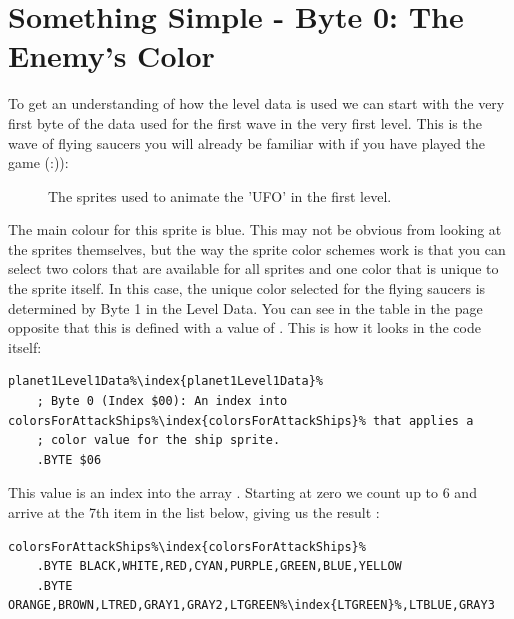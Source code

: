 \section{Something Simple - Byte 0: The Enemy's Color}
To get an understanding of how the level data is used we can start with the very first byte of the data
used for the first wave in the very first level. This is the wave of flying saucers you will already be
familiar with if you have played the game (:)):
\begin{figure}[H]
  {
    \setlength{\tabcolsep}{3.0pt}
    \setlength\cmidrulewidth{\heavyrulewidth} %
	\centering
	\def\MULTICOLORONE{white}
	\def\MULTICOLORTWO{red}
	\def\SPRITECOLOR{blue}
	\begin{subfigure}{0.3\textwidth}
		
	\end{subfigure}
	\begin{subfigure}{0.3\textwidth}
		
	\end{subfigure}
	\begin{subfigure}{0.3\textwidth}
		
	\end{subfigure}
  }\caption[position=top]{The sprites used to animate the 'UFO' in the first level.}
\end{figure}

The main colour for this sprite is blue. This may not be obvious from looking at the sprites themselves, but
the way the sprite color schemes work is that you can select two colors that are available for all sprites and
one color that is unique to the sprite itself. In this case, the unique color selected for the flying saucers is
determined by Byte 1 in the Level Data. You can see in the table in the page opposite
that this is defined with a value of . This is how it looks in the code itself:

\begin{lstlisting}[escapechar=\%]
planet1Level1Data%\index{planet1Level1Data}%
    ; Byte 0 (Index $00): An index into colorsForAttackShips%\index{colorsForAttackShips}% that applies a
    ; color value for the ship sprite.
    .BYTE $06
\end{lstlisting}

This value is an index into the array . Starting at zero we count up to 6
and arrive at the 7th item in the list below, giving us the result :
\begin{lstlisting}[escapechar=\%]
colorsForAttackShips%\index{colorsForAttackShips}%
    .BYTE BLACK,WHITE,RED,CYAN,PURPLE,GREEN,BLUE,YELLOW
    .BYTE ORANGE,BROWN,LTRED,GRAY1,GRAY2,LTGREEN%\index{LTGREEN}%,LTBLUE,GRAY3
\end{lstlisting}

